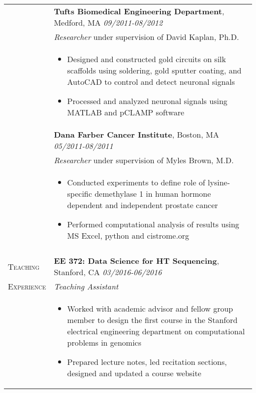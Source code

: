 \documentclass[letterpaper,11pt,oneside]{article}
\begin{document}
\begin{longtable}{@{} p{2.5cm} p{14.8cm}}
& \textbf{Tufts Biomedical Engineering Department}, Medford, MA \hfill \textit{09/2011-08/2012} \\
& \textit{Researcher} under supervision of David Kaplan, Ph.D. \\ 
& 
\vspace{-7mm}
\begin{itemize}[leftmargin=.5cm]
	\setlength\itemsep{-0.3em}
	\item Designed and constructed gold circuits on silk scaffolds using soldering, gold sputter coating, and AutoCAD to control and detect neuronal signals
	\item Processed and analyzed neuronal signals using MATLAB and pCLAMP software
\end{itemize} 
\\

& \textbf{Dana Farber Cancer Institute}, Boston, MA \hfill \textit{05/2011-08/2011} \\
& \textit{Researcher} under supervision of Myles Brown, M.D. \\ 
& 
\vspace{-7mm}
\begin{itemize}[leftmargin=.5cm]
	\setlength\itemsep{-0.3em}
	\item Conducted experiments to define role of lysine-specific demethylase 1 in human hormone dependent and independent prostate cancer
	\item Performed computational analysis of results using MS Excel, python and cistrome.org
\end{itemize} 
\\
& \\

  \large{\textsc{Teaching}}  & \textbf{EE 372: Data Science for HT Sequencing}, Stanford, CA \hfill \textit{03/2016-06/2016} \\
  \large{\textsc{Experience}}  & \textit{Teaching Assistant} \\ 
& 
\vspace{-7mm}
\begin{itemize}[leftmargin=.5cm]
	\setlength\itemsep{-0.3em}
	\item Worked with academic advisor and fellow group member to design the first course in the Stanford electrical engineering department on computational problems in genomics
	\item Prepared lecture notes, led recitation sections, designed and updated a course website
\end{itemize} 
\\


\end{longtable}
\end{document}
